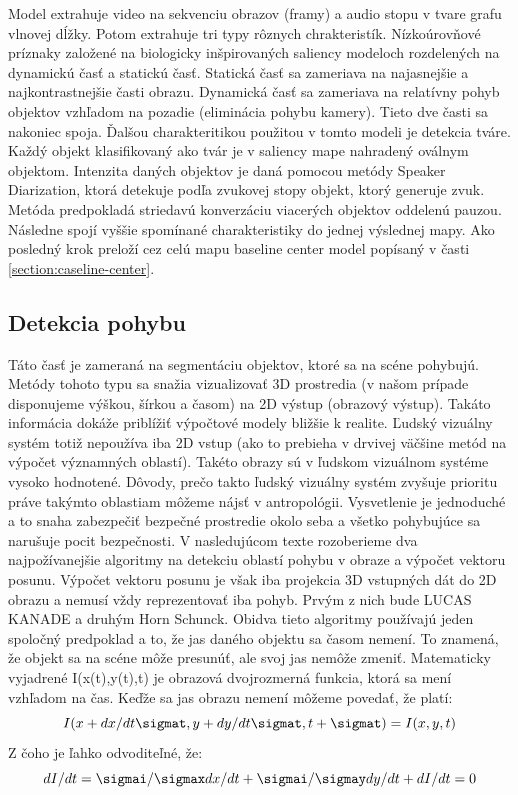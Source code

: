 Model extrahuje video na sekvenciu obrazov (framy) a audio stopu v tvare grafu vlnovej dĺžky.
Potom extrahuje tri typy rôznych chrakteristík.
Nízkoúrovňové príznaky založené na biologicky inšpirovaných saliency modeloch rozdelených na dynamickú časť a statickú časť.
Statická časť sa zameriava na najasnejšie a najkontrastnejšie časti obrazu.
Dynamická časť sa zameriava na relatívny pohyb objektov vzhľadom na pozadie (eliminácia pohybu kamery).
Tieto dve časti sa nakoniec spoja.
Ďalšou charakteritikou použitou v tomto modeli je detekcia tváre.
Každý objekt klasifikovaný ako tvár je v saliency mape nahradený oválnym objektom.
Intenzita daných objektov je daná pomocou metódy Speaker Diarization\cite{sound-courot-2}, ktorá detekuje podľa zvukovej stopy objekt, ktorý generuje zvuk.
Metóda predpokladá striedavú konverzáciu viacerých objektov oddelenú pauzou.
Následne spojí vyššie spomínané charakteristiky do jednej výslednej mapy.
Ako posledný krok preloží cez celú mapu baseline center model popísaný v časti \ref{section:caseline-center}.

\subsection{Detekcia pohybu}
Táto časť je zameraná na segmentáciu objektov, ktoré sa na scéne pohybujú.
Metódy tohoto typu sa snažia vizualizovať 3D prostredia (v našom prípade disponujeme výškou, šírkou a časom) na 2D výstup (obrazový výstup).
Takáto informácia dokáže priblížiť výpočtové modely bližšie k realite.
Ľudský vizuálny systém totiž nepoužíva iba 2D vstup (ako to prebieha v drvivej väčšine metód na výpočet významných oblastí).
Takéto obrazy sú v ľudskom vizuálnom systéme vysoko hodnotené.
Dôvody, prečo takto ľudský vizuálny systém zvyšuje prioritu práve takýmto oblastiam môžeme nájsť v antropológii.
Vysvetlenie je jednoduché a to snaha zabezpečiť bezpečné prostredie okolo seba a všetko pohybujúce sa narušuje pocit bezpečnosti.
V nasledujúcom texte rozoberieme dva najpožívanejšie algoritmy na detekciu oblastí pohybu v obraze a výpočet vektoru posunu.
Výpočet vektoru posunu je však iba projekcia 3D vstupných dát do 2D obrazu a nemusí vždy reprezentovať iba pohyb.
Prvým z nich bude LUCAS KANADE\cite{lucas-kanade} a druhým Horn Schunck\cite{horn-schunck}.
Obidva tieto algoritmy používajú jeden spoločný predpoklad a to, že jas daného objektu sa časom nemení.
To znamená, že objekt sa na scéne môže presunúť, ale svoj jas nemôže zmeniť.
Matematicky vyjadrené I(x(t),y(t),t) je obrazová dvojrozmerná funkcia, ktorá sa mení vzhľadom na čas.
Keďže sa jas obrazu nemení môžeme povedať, že platí:
\begin{equation}
  I(x + dx/dt \sigmat ,y + dy/dt \sigmat, t + \sigmat) = I(x,y,t)
\end{equation}
Z čoho je ľahko odvoditeľné, že:
\begin{equation}
  dI/dt = \sigmai/\sigmax dx/dt + \sigmai/\sigmay dy/dt + dI/dt  =  0
\end{equation}

